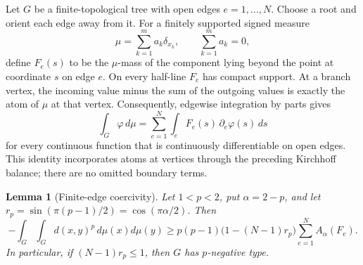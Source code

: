\documentclass[11pt]{article}
\newtheorem{lemma}[theorem]{Lemma}
\begin{document}
Let $G$ be a finite-topological tree with open edges
$e=1,\ldots,N$.  Choose a root and orient each edge away from it.  For a
finitely supported signed measure
\[
  \mu=\sum_{k=1}^m a_k\delta_{x_k},\qquad \sum_{k=1}^m a_k=0,
\]
define $F_e(s)$ to be the $\mu$-mass of the component lying beyond the point
at coordinate $s$ on edge $e$.  On every half-line $F_e$ has compact support.
At a branch vertex, the incoming value minus the sum of the outgoing values
is exactly the atom of $\mu$ at that vertex.  Consequently, edgewise
integration by parts gives
\begin{equation}\label{eq:flowibp}
  \int_G \varphi\,d\mu
  =\sum_{e=1}^N\int_e F_e(s)\,\partial_e\varphi(s)\,ds
\end{equation}
for every continuous function that is continuously differentiable on open
edges.  This identity incorporates atoms at vertices through the preceding
Kirchhoff balance; there are no omitted boundary terms.

\begin{lemma}[Finite-edge coercivity]\label{lem:tree}
Let $1<p<2$, put $\alpha=2-p$, and let
$r_p=\sin(\pi(p-1)/2)=\cos(\pi\alpha/2)$.  Then
\begin{equation}\label{eq:coercive}
 -\int_G\!\int_G d(x,y)^p\,d\mu(x)d\mu(y)
 \ge p(p-1)\bigl(1-(N-1)r_p\bigr)
       \sum_{e=1}^N A_\alpha(F_e).
\end{equation}
In particular, if $(N-1)r_p\le1$, then $G$ has $p$-negative type.
\end{lemma}
\end{document}
